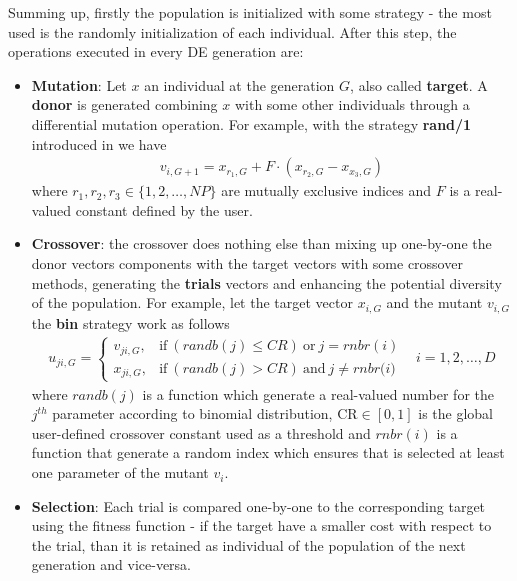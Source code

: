 Summing up, firstly the population is initialized with some strategy - the most used is the randomly initialization of each individual. After this step, the operations executed in every DE generation are:
\begin{itemize}
	\item{\textbf{Mutation}: Let $x$ an individual at the generation $G$, also called \textbf{target}. A \textbf{donor} is generated combining $x$ with some other individuals through a differential mutation operation. For example, with the strategy \textbf{rand/1} introduced in \cite{DESEHGOCS:1997} we have
	\begin{align}
		v_{i,G+1} = x_{r_{1},G} + F\cdot(x_{r_{2},G} - x_{x_{3},G})
	\end{align}
	where $r_{1},r_{2},r_{3} \in \{1,2,\dots,NP\}$ are mutually exclusive indices and $F$ is a real-valued constant defined by the user.}
	\item{\textbf{Crossover}: the crossover does nothing else than mixing up one-by-one the donor vectors components with the target vectors with some crossover methods, generating the \textbf{trials} vectors and enhancing the potential diversity of the population. For example, let the target vector $x_{i,G}$ and the mutant $v_{i,G}$ the \textbf{bin} strategy work as follows
\begin{align}
	u_{ji, G} = \begin{cases}
		v_{ji,G}, & \textrm{if}\ (\textit{randb}(j) \leq \textit{CR})\ \textrm{or}\ j=\textit{rnbr}(i)\\
		x_{ji,G}, & \textrm{if}\ (\textit{randb}(j) > \textit{CR})\ \textrm{and}\ j\neq\textit{rnbr(i)}
	\end{cases} & i=1,2,\dots,D
\end{align}
where  $\textit{randb}(j)$ is a function which generate a real-valued number for the $j^{th}$ parameter according to binomial distribution, $\textrm{CR}\in[0,1]$ is the global user-defined crossover constant used as a threshold and $\textit{rnbr}(i)$ is a function that generate a random index which ensures that is selected at least one parameter of the mutant $v_{i}$.}
	\item{\textbf{Selection}: Each trial is compared one-by-one to the corresponding target using the fitness function - if the target have a smaller cost with respect to the trial, than it is retained as individual of the population of the next generation and vice-versa.}
\end{itemize}


